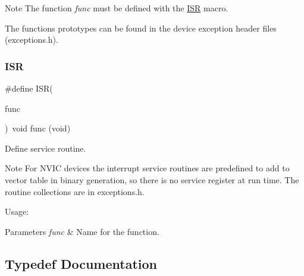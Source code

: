 \begin{DoxyNote}{Note}
The function {\itshape func} must be defined with the \mbox{\hyperlink{group__interrupt__group_ga0da0a19156773eca7070722f26ff66a6}{I\+SR}} macro. 

The functions prototypes can be found in the device exception header files (exceptions.\+h). 
\end{DoxyNote}
\mbox{\label{group__interrupt__group_ga0da0a19156773eca7070722f26ff66a6}} 
\subsubsection{\texorpdfstring{ISR}{ISR}}
{\footnotesize\ttfamily \#define I\+SR(\begin{DoxyParamCaption}\item[{}]{func }\end{DoxyParamCaption})~void func (void)}



Define service routine. 

\begin{DoxyNote}{Note}
For N\+V\+IC devices the interrupt service routines are predefined to add to vector table in binary generation, so there is no service register at run time. The routine collections are in exceptions.\+h.
\end{DoxyNote}
Usage\+: 
\begin{DoxyCode}{0}
\DoxyCodeLine{\{}
\DoxyCodeLine{     \textcolor{comment}{// Function definition}}
\DoxyCodeLine{\}}
\end{DoxyCode}



\begin{DoxyParams}{Parameters}
{\em func} & Name for the function. \\
\hline
\end{DoxyParams}


\subsection{Typedef Documentation}
\mbox{\label{group__interrupt__group_ga9aa1f52defc97531b6343233abeea613}} 
